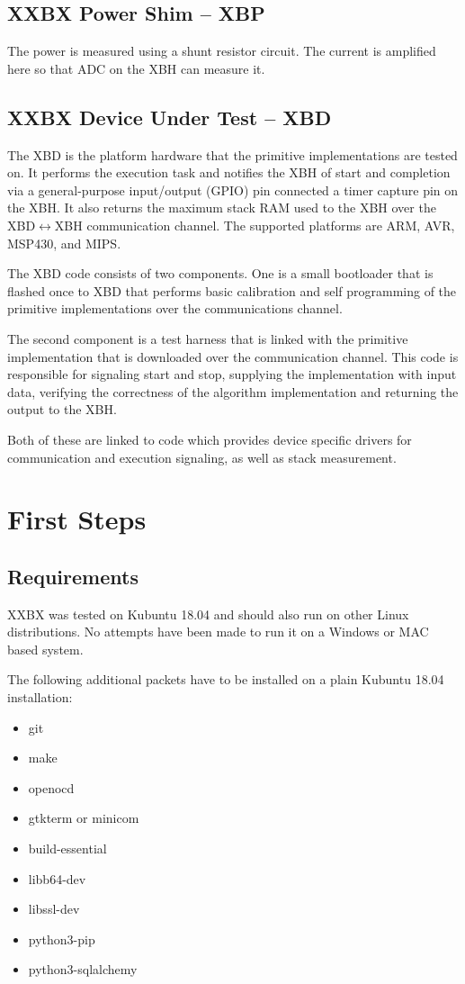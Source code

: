 \documentclass[twoside,11pt]{cergdoc}
\begin{document}
  \section{XXBX Power Shim -- XBP}
 The power is measured
using a shunt resistor circuit. The current is amplified
here so that ADC on the XBH can measure it.


  \section{XXBX Device Under Test -- XBD}
The XBD is the platform hardware that the primitive implementations are tested
on. It performs the execution task and
notifies the XBH of start and completion via a general-purpose input/output
(GPIO) pin connected a timer capture pin on the XBH. It also returns the maximum
stack RAM used to the XBH over the XBD$\leftrightarrow$XBH communication
    channel. The supported platforms are ARM, AVR, MSP430, and MIPS. 

The XBD code consists of two components. One is a small bootloader that is
flashed once to XBD that performs basic calibration and self programming of the
primitive implementations over the communications channel. 

The second component is a test harness that is linked with the
primitive implementation that is downloaded over the communication channel. This
code is responsible for signaling start and stop, supplying the implementation
with input data, verifying the correctness of the algorithm implementation and
returning the output to the XBH. 

Both of these are linked to code which provides device specific drivers for
communication and execution signaling, as well as stack measurement. 


\chapter{First Steps}
  \section{Requirements}
  XXBX was tested on Kubuntu 18.04 and should also run on other Linux distributions.
  No attempts have been made to run it on a Windows or MAC based system.

  The following additional packets have to be installed on a plain Kubuntu 18.04 installation:
  \begin{itemize}
    \item git
    \item make
    \item openocd
    \item gtkterm or minicom
    \item build-essential
    \item libb64-dev
    \item libssl-dev
    \item python3-pip
    \item python3-sqlalchemy
  \end{itemize}
\end{document}
